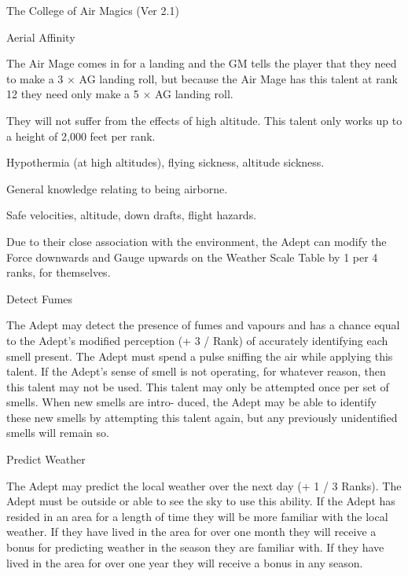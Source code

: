 \begin{Chapter}{The College of Air Magics (Ver 2.1)}
\begin{talent}[T-1]{Aerial Affinity}
\begin{effects}
\begin{Enumerate}
\begin{example}
The Air Mage comes in for a landing and the GM tells the player that
they need to make a 3 × AG landing roll, but because the Air Mage has
this talent at rank 12 they need only make a 5 × AG landing roll.
\end{example}

\item They will not suffer from the effects of high altitude.  This
  talent only works up to a height of 2,000 feet per rank.

\begin{example} 
Hypothermia (at high altitudes), flying sickness, altitude sickness.
\end{example}

\item General knowledge relating to being airborne. 
\begin{example}
Safe velocities, altitude, down drafts, flight hazards.
\end{example}

\item Due to their close association with the environment, the Adept
  can modify the Force downwards and Gauge upwards on the Weather
  Scale Table by 1 per 4 ranks, for themselves.
\end{Enumerate}
\end{effects}
\end{talent}

\begin{talent}[T-2]{Detect Fumes}

\begin{effects}
The Adept may detect the presence of fumes and vapours and has a
chance equal to the Adept’s modified perception (+ 3 / Rank) of
accurately identifying each smell present.  The Adept must spend a
pulse sniffing the air while applying this talent.  If the Adept’s
sense of smell is not operating, for whatever reason, then this talent
may not be used.  This talent may only be attempted once per set of
smells. When new smells are intro- duced, the Adept may be able to
identify these new smells by attempting this talent again, but any
previously unidentified smells will remain so.
\end{effects}
\end{talent}

\begin{talent}[T-3]{Predict Weather}

\begin{effects}
The Adept may predict the local weather over the next day (+ 1 / 3
Ranks). The Adept must be outside or able to see the sky to use this
ability.  If the Adept has resided in an area for a length of time
they will be more familiar with the local weather. If they have lived
in the area for over one month they will receive a bonus for
predicting weather in the season they are familiar with. If they have
lived in the area for over one year they will receive a bonus in any
season.


\end{effects}
\end{talent}
\end{Chapter}
